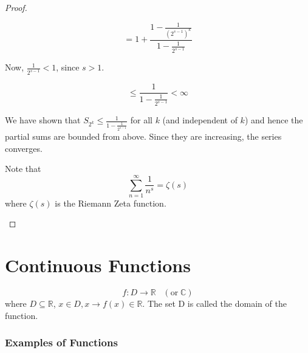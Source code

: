 \documentclass[12pt]{scrbook}
\begin{document}
\begin{proof}
\begin{enumerate}
\[ = 1 + \frac{1 - \frac{1}{(2^{s-1})^k} } {1 - \frac{1}{2^{s-1}} } \]

Now, $\frac{1}{2^{s-1}} < 1$, since $s > 1$.

\[ \le \frac{1}{1 - \frac{1}{2^{s-1}}}  < \infty \]

We have shown that $S_{2^k} \le \frac{1}{1 - \frac{1}{2^{s-1}}}$ for all $k$ (and independent of $k$) and hence the partial sums are bounded from above.  Since they are increasing, the series converges.

Note that 
\[ \sum_{n=1}^{\infty} \frac{1}{n^s} = \zeta(s) \]
where $\zeta(s)$ is the Riemann Zeta function.

\end{enumerate}  

\end{proof}


\chapter{Continuous Functions}

\[ f : D \rightarrow \mathbb{R} \;\;\; (\text{or} \; \mathbb{C}) \] 
where $D \subseteq \mathbb{R} $,  $x \in D, x \rightarrow f(x) \in \mathbb{R} $.
The set D is called the domain of the function.

\subsection{Examples of Functions}
\end{document}
